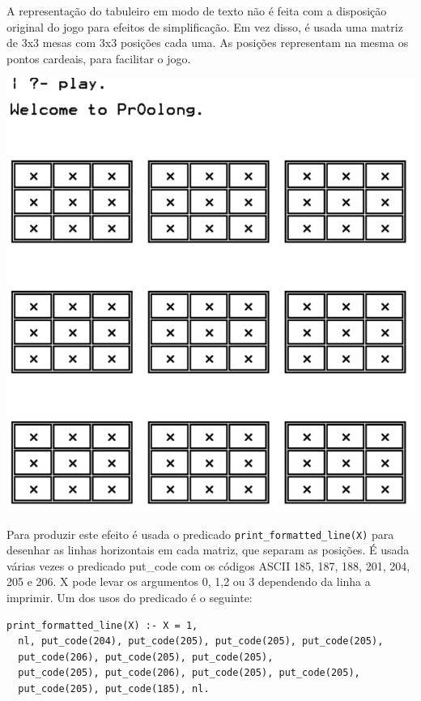 \documentclass[a4paper]{article}
\begin{document}
A representação do tabuleiro em modo de texto não é feita com a disposição original do jogo para efeitos de simplificação. Em vez disso, é usada uma matriz de 3x3 mesas com 3x3 posições cada uma. As posições representam na mesma os pontos cardeais, para facilitar o jogo.

\begin{center}
\includegraphics[scale=0.33]{tabuleiro.png}
\end{center}

Para produzir este efeito é usada o predicado \texttt{print\_formatted\_line(X)} para desenhar as linhas horizontais em cada matriz, que separam as posições. É usada várias vezes o predicado put\_code com os códigos ASCII 185, 187, 188, 201, 204, 205 e 206. X pode levar os argumentos 0, 1,2 ou 3 dependendo da linha a imprimir. Um dos usos do predicado é o seguinte:

\begin{lstlisting}
print_formatted_line(X) :- X = 1, 
  nl, put_code(204), put_code(205), put_code(205), put_code(205), 
  put_code(206), put_code(205), put_code(205), 
  put_code(205), put_code(206), put_code(205), put_code(205), 
  put_code(205), put_code(185), nl.
\end{lstlisting}
\end{document}
